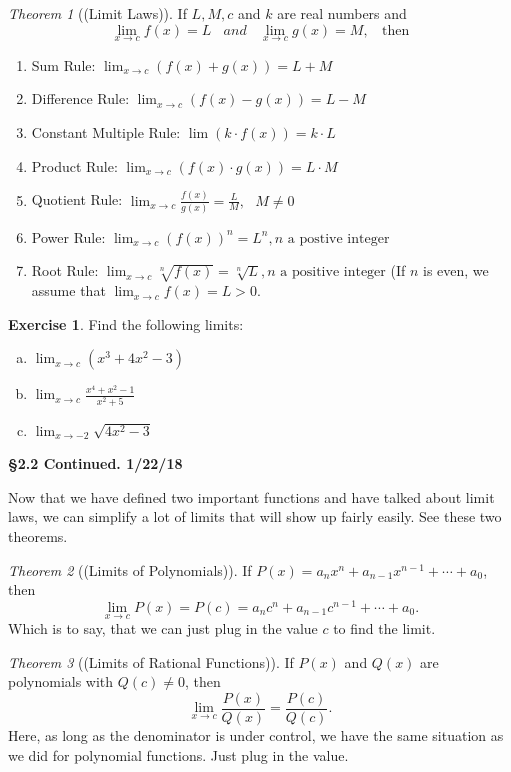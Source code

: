 \documentclass[leqno]{article}
\theoremstyle{definition}
\newtheorem{exercise}{Exercise}[section]
\theoremstyle{remark}
\theoremstyle{theorem}
\newtheorem{theorem}{Theorem}[section]
\begin{document}
\begin{theorem}[(Limit Laws)]
\label{theorem: limit_laws}
If $L, M, c$ and $k$ are real numbers and
\[
\lim_{x\to c} f(x)=L ~~~~ and ~~~~ \lim_{x\to c} g(x)=M, ~~~~ \textrm{then}
\]
\begin{enumerate}[1.]
\item Sum Rule: $\lim_{x\to c} (f(x)+g(x))=L+M$
\item Difference Rule: $\lim_{x\to c} (f(x)-g(x))=L-M$
\item Constant Multiple Rule: $\lim(k\cdot f(x))=k\cdot L$
\item Product Rule: $\lim_{x\to c}(f(x)\cdot g(x))=L\cdot M$
\item Quotient Rule: $\lim_{x\to c} \frac{f(x)}{g(x)}=\frac{L}{M}, ~~~ M\neq 0$
\item Power Rule: $\lim_{x\to c}(f(x))^n = L^n, n \textrm{ a postive integer}$
\item Root Rule: $\lim_{x\to c} \sqrt[n]{f(x)} = \sqrt[n]{L}, n \textrm{ a positive integer}$ (If $n$ is even, we assume that $\lim_{x\to c}f(x)=L>0$.
\end{enumerate}
\end{theorem}

\begin{exercise}
Find the following limits:
\begin{enumerate}[(a)]
\item $\lim_{x\to c}(x^3+4x^2-3)$
\item $\lim_{x\to c}\frac{x^4+x^2-1}{x^2+5}$
\item $\lim_{x\to -2} \sqrt{4x^2-3}$
\end{enumerate}
\vspace*{5cm}
\end{exercise}

\noindent \textbf{\Large{\S 2.2 Continued.  1/22/18}}

Now that we have defined two important functions and have talked about limit laws, we can simplify a lot of limits that will show up fairly easily.  See these two theorems.

\begin{theorem}[(Limits of Polynomials)]
If $P(x)=a_nx^n +a_{n-1}x^{n-1}+\cdots + a_0$, then
\[
\lim_{x\to c} P(x)=P(c)=a_nc^n + a_{n-1}c^{n-1}+\cdots + a_0.
\]
Which is to say, that we can just plug in the value $c$ to find the limit.
\end{theorem}

\begin{theorem}[(Limits of Rational Functions)]
If $P(x)$ and $Q(x)$ are polynomials with $Q(c)\neq 0$, then
\[
\lim_{x\to c} \frac{P(x)}{Q(x)}=\frac{P(c)}{Q(c)}.
\]
Here, as long as the denominator is under control, we have the same situation as we did for polynomial functions.  Just plug in the value.
\end{theorem}
\end{document}

